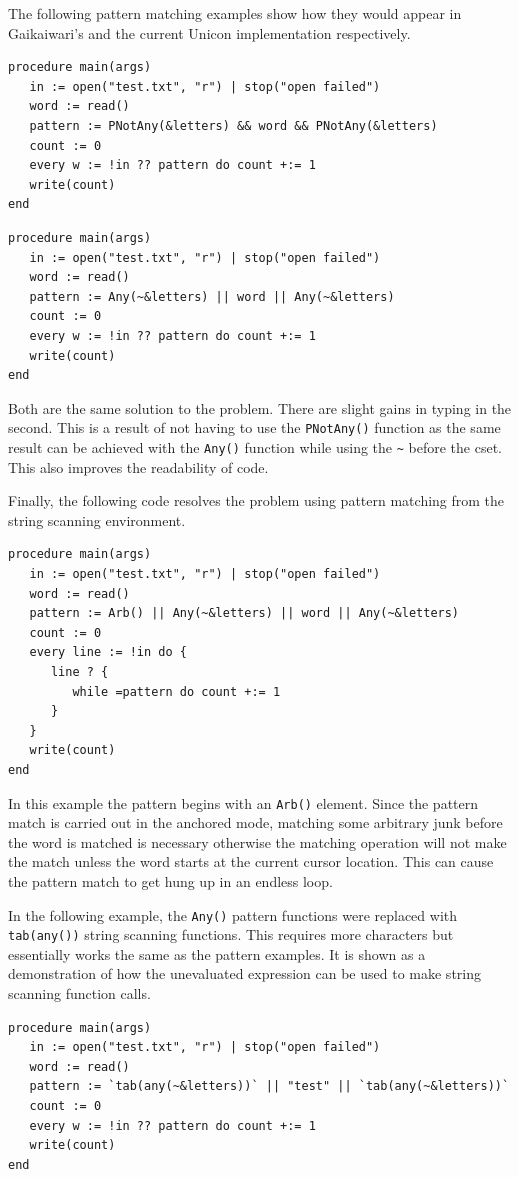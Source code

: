\documentclass{article}
\begin{document}
The following pattern matching examples show how they would appear in Gaikaiwari's and the current Unicon implementation respectively.
\begin{verbatim}
procedure main(args)
   in := open("test.txt", "r") | stop("open failed")
   word := read()
   pattern := PNotAny(&letters) && word && PNotAny(&letters)
   count := 0
   every w := !in ?? pattern do count +:= 1
   write(count)
end
\end{verbatim}

\begin{verbatim}
procedure main(args)
   in := open("test.txt", "r") | stop("open failed")
   word := read()
   pattern := Any(~&letters) || word || Any(~&letters)
   count := 0
   every w := !in ?? pattern do count +:= 1
   write(count)
end
\end{verbatim}
Both are the same solution to the problem.  There are slight gains in typing in the second.  This is a result of not having to use the \texttt{PNotAny()} function as the same result can be achieved with the \texttt{Any()} function while using the \texttt{\~} before the cset.  This also improves the readability of code.

Finally, the following code resolves the problem using pattern matching from the string scanning environment.
\begin{verbatim}
procedure main(args)
   in := open("test.txt", "r") | stop("open failed")
   word := read()
   pattern := Arb() || Any(~&letters) || word || Any(~&letters)
   count := 0
   every line := !in do {
      line ? {
         while =pattern do count +:= 1
      }
   }
   write(count)
end
\end{verbatim}
In this example the pattern begins with an \texttt{Arb()} element.  Since the pattern match is carried out in the anchored mode, matching some arbitrary junk before the word is matched is necessary otherwise the matching operation will not make the match unless the word starts at the current cursor location.  This can cause the pattern match to get hung up in an endless loop.

In the following example, the \texttt{Any()} pattern functions were replaced with \texttt{tab(any())} string scanning functions.  This requires more characters but essentially works the same as the pattern examples.  It is shown as a demonstration of how the unevaluated expression can be used to make string scanning function calls.
\begin{verbatim}
procedure main(args)
   in := open("test.txt", "r") | stop("open failed")
   word := read()
   pattern := `tab(any(~&letters))` || "test" || `tab(any(~&letters))`
   count := 0
   every w := !in ?? pattern do count +:= 1
   write(count)
end
\end{verbatim}
\end{document}
